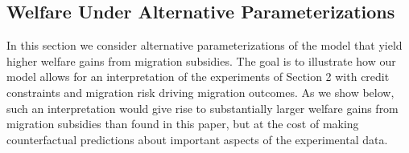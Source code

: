 \documentclass[12pt,pdftex]{article}
\renewcommand{\arraystretch}{1.1}
\begin{document}
\begin{onehalfspacing}
\newpage

\section{Welfare Under Alternative Parameterizations}

In this section we consider alternative parameterizations of the model that yield higher welfare gains from migration subsidies. The goal is to illustrate how our model allows for an interpretation of the experiments of Section 2 with credit constraints and migration risk driving migration outcomes. As we show below, such an interpretation would give rise to substantially larger welfare gains from migration subsidies than found in this paper, but at the cost of making counterfactual predictions about important aspects of the experimental data.

\begin{table}[h]
\small
\setlength {\tabcolsep}{3.75mm}
\renewcommand{\arraystretch}{1.5}
\centering


\end{table}
\end{onehalfspacing}
\end{document}
